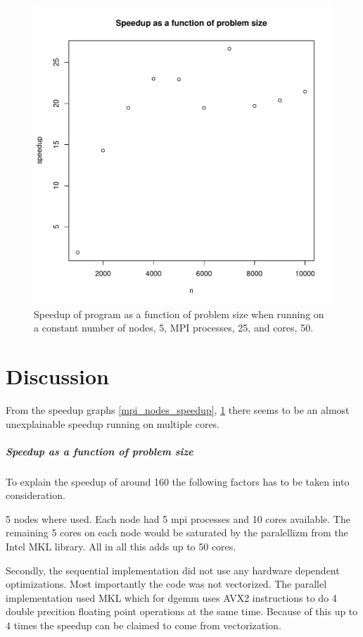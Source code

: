 \documentclass{article}
\begin{document}
\begin{figure}[H]
  \begin{center}
    \includegraphics[width=12cm]{../analysis/problem_size_speedup.pdf}
  \end{center}
  \caption{Speedup of program as a function of problem size when running on a constant number of nodes, 5, MPI processes, 25, and cores, 50.}
  \label{problem_size_speedup}
\end{figure}

\section{Discussion}
From the speedup graphs \ref{mpi_nodes_speedup}, \ref{problem_size_speedup} there seems to be an almost unexplainable speedup running on
multiple cores.
\subparagraph{Speedup as a function of problem size}
To explain the speedup of around 160 the following factors has
to be taken into consideration.

5 nodes where used. Each node had
5 mpi processes and 10 cores available. The remaining 5 cores on each
node would be saturated by the paralellizm from the Intel MKL library.
All in all this adds up to 50 cores.

Secondly, the sequential implementation did not use any hardware dependent
optimizations. Most importantly the code was not vectorized. The parallel
implementation used MKL which for dgemm uses AVX2 instructions to do
4 double precition floating point operations at the same time. Because of
this up to 4 times the speedup can be claimed to come from vectorization.
\end{document}
